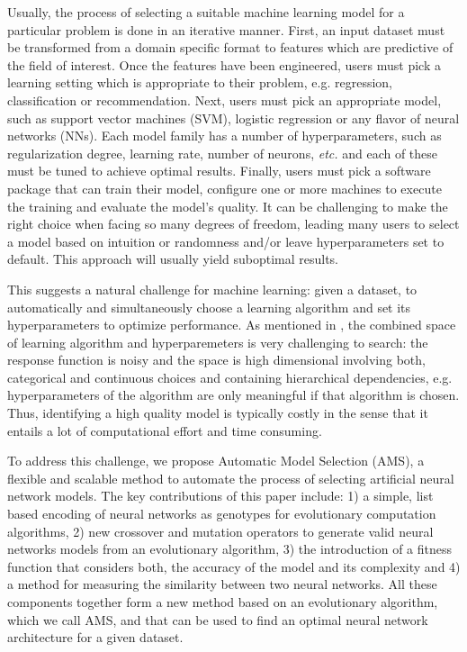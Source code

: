 \documentclass[12pt]{elsart}%
\begin{document}
Usually, the process of selecting a suitable machine learning model for a particular problem is done in an iterative manner. First, an input dataset must be transformed from a domain specific format to features which are predictive of the field of interest. Once the features have been engineered, users must pick a learning setting which is appropriate to their problem, e.g. regression, classification or recommendation. Next, users must pick an appropriate model, such as support vector machines (SVM), logistic regression or any flavor of neural networks (NNs). Each model family has a number of hyperparameters, such as regularization degree, learning rate, number of neurons, \textit{etc.} and each of these must be tuned to achieve optimal results. Finally, users must pick a software package that can train their model, configure one or more machines to execute the training and evaluate the model's quality. It can be challenging to make the right choice when facing so many degrees of freedom, leading many users to select a model based on intuition or randomness and/or leave hyperparameters set to default. This approach will usually yield suboptimal results.

This suggests a natural challenge for machine learning: given a dataset, to automatically and simultaneously choose a learning algorithm and set its hyperparameters to optimize performance. As mentioned in \cite{Hall2009}, the combined space of learning algorithm and hyperparemeters is very challenging to search: the response function is noisy and the space is high dimensional involving both, categorical and continuous choices and containing hierarchical dependencies, e.g. hyperparameters of the algorithm are only meaningful if that algorithm is chosen. Thus, identifying a high quality model is typically costly in the sense that it entails a lot of computational effort and time consuming.

To address this challenge, we propose Automatic Model Selection (AMS), a flexible and scalable method to automate the process of selecting artificial neural network models. The key contributions of this paper include: 1) a simple, list based encoding of neural networks as genotypes for evolutionary computation algorithms, 2) new crossover and mutation operators to generate valid neural networks models from an evolutionary algorithm, 3) the introduction of a fitness function that considers both, the accuracy of the model and its complexity and 4) a method for measuring the similarity between two neural networks. All these components together form a new method based on an evolutionary algorithm, which we call AMS, and that can be used to find an optimal neural network architecture for a given dataset.
\end{document}
